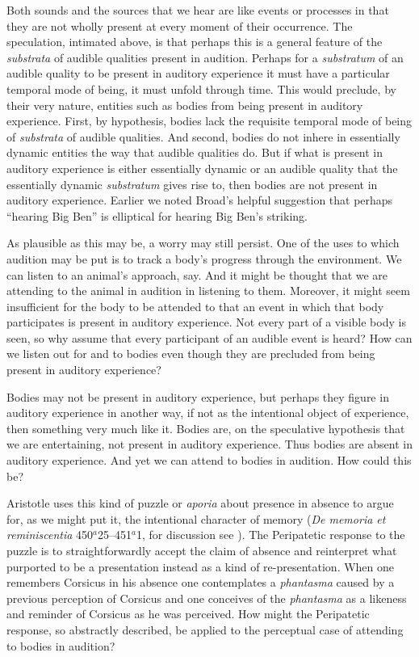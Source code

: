 Both sounds and the sources that we hear are like events or processes in that they are not wholly present at every moment of their occurrence. The speculation, intimated above, is that perhaps this is a general feature of the \emph{substrata} of audible qualities present in audition. Perhaps for a \emph{substratum} of an audible quality to be present in auditory experience it must have a particular temporal mode of being, it must unfold through time. This would preclude, by their very nature, entities such as bodies from being present in auditory experience. First, by hypothesis, bodies lack the requisite temporal mode of being of \emph{substrata} of audible qualities. And second, bodies do not inhere in essentially dynamic entities the way that audible qualities do. But if what is present in auditory experience is either essentially dynamic or an audible quality that the essentially dynamic \emph{substratum} gives rise to, then bodies are not present in auditory experience. Earlier we noted Broad's helpful suggestion that perhaps ``hearing Big Ben'' is elliptical for hearing Big Ben's striking.

As plausible as this may be, a worry may still persist. One of the uses to which audition may be put is to track a body's progress through the environment. We can listen to an animal's approach, say. And it might be thought that we are attending to the animal in audition in listening to them. Moreover, it might seem insufficient for the body to be attended to that an event in which that body participates is present in auditory experience. Not every part of a visible body is seen, so why assume that every participant of an audible event is heard? How can we listen out for and to bodies even though they are precluded from being present in auditory experience? 

Bodies may not be present in auditory experience, but perhaps they figure in auditory experience in another way, if not as the intentional object of experience, then something very much like it. Bodies are, on the speculative hypothesis that we are entertaining, not present in auditory experience. Thus bodies are absent in auditory experience. And yet we can attend to bodies in audition. How could this be? 

Aristotle uses this kind of puzzle or \emph{aporia} about presence in absence to argue for, as we might put it, the intentional character of memory (\emph{De memoria et reminiscentia} 450\( ^{a} \)25--451\( ^{a} \)1, for discussion see \citealt{Sorabji:2004qa}). The Peripatetic response to the puzzle is to straightforwardly accept the claim of absence and reinterpret what purported to be a presentation instead as a kind of re-presentation. When one remembers Corsicus in his absence one contemplates a \emph{phantasma} caused by a previous perception of Corsicus and one conceives of the \emph{phantasma} as a likeness and reminder of Corsicus as he was perceived. How might the Peripatetic response, so abstractly described, be applied to the perceptual case of attending to bodies in audition? 

